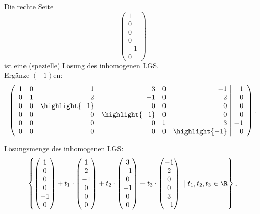 Die rechte Seite
$$
	\begin{pmatrix}
		1\\
		0\\
		0\\
		0\\
		-1\\
		0
	\end{pmatrix}
$$
ist eine (spezielle) L\"osung des inhomogenen LGS.\\[2mm]

Erg\"anze $(-1)$en:
$$
	\left(
	\begin{array}{rrrrrr | r}
		1	& 0	& 1			& 3			& 0	& -1			& 1\\	
		0	& 1	& 2			& -1			& 0	& 2			& 0\\
		0	& 0	& \highlight{-1}	& 0			& 0	& 0			& 0\\
		0	& 0	& 0			&  \highlight{-1}	& 0	& 0			& 0\\
		0	& 0	& 0			& 0 			& 1	& 3			& -1\\
		0	& 0	& 0			& 0			& 0	&  \highlight{-1}	& 0
	\end{array}
	\right).
$$

L\"osungsmenge des inhomogenen LGS:
$$
	\left\{
		\begin{pmatrix}
			1\\
			0\\
			0\\
			0\\
			-1\\
			0
		\end{pmatrix}
		+
		t_1 \cdot
		\begin{pmatrix}
			1\\
			2\\
			-1\\
			0\\
			0\\
			0
		\end{pmatrix}	
		+t_2\cdot
		\begin{pmatrix}
			3\\
			-1\\
			0\\
			-1\\
			0\\
			0
		\end{pmatrix}	
		+t_3\cdot
		\begin{pmatrix}
			-1\\
			2\\
			0\\
			0\\
			3\\
			-1
		\end{pmatrix}	
		~|~
		t_1, t_2, t_3 \in \R	
	\right\}.
$$

